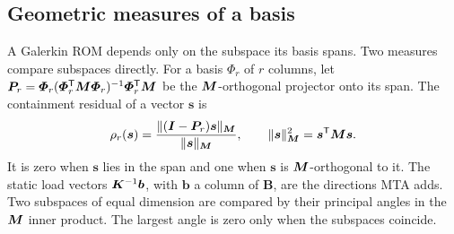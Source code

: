 \documentclass[preprint,12pt]{elsarticle}
\begin{document}
\subsection{Geometric measures of a basis}\label{sec:geommeasure}
A Galerkin ROM depends only on the subspace its basis spans. Two measures compare subspaces directly.
For a basis $\bm{\varPhi}_r$ of $r$ columns, let $\bm{P}_r=\bm{\varPhi}_r(\bm{\varPhi}_r^{\mathsf T}\bm{M}\bm{\varPhi}_r)^{-1}\bm{\varPhi}_r^{\mathsf T}\bm{M}$ be the $\bm{M}$-orthogonal projector onto its span. The containment residual of a vector $\bm{s}$ is
\begin{equation}
\rho_r(\bm{s})=\frac{\|(\bm{I}-\bm{P}_r)\bm{s}\|_{\bm{M}}}{\|\bm{s}\|_{\bm{M}}},\qquad \|\bm{s}\|_{\bm{M}}^2=\bm{s}^{\mathsf T}\bm{M}\bm{s}.
\label{eq:contain}
\end{equation}
It is zero when $\bm{s}$ lies in the span and one when $\bm{s}$ is $\bm{M}$-orthogonal to it. The static load vectors $\bm{K}^{-1}\bm{b}$, with $\bm{b}$ a column of $\bm{B}$, are the directions MTA adds.
Two subspaces of equal dimension are compared by their principal angles in the $\bm{M}$ inner product. The largest angle is zero only when the subspaces coincide.
\end{document}
